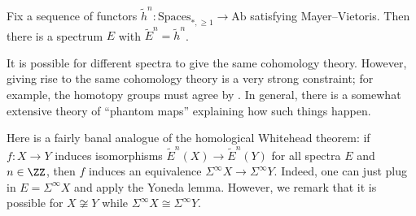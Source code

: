\documentclass[../notes.tex]{subfiles}
\begin{document}
\begin{theorem}
	Fix a sequence of functors $\widetilde h^n\colon\mathrm{Spaces}_{*,\ge1}\to\mathrm{Ab}$ satisfying Mayer--Vietoris. Then there is a spectrum $E$ with $\widetilde E^n=\widetilde h^n$.
\end{theorem}
\begin{remark}
	It is possible for different spectra to give the same cohomology theory. However, giving rise to the same cohomology theory is a very strong constraint; for example, the homotopy groups must agree by . In general, there is a somewhat extensive theory of ``phantom maps'' explaining how such things happen.
\end{remark}
\begin{remark}
	Here is a fairly banal analogue of the homological Whitehead theorem: if $f\colon X\to Y$ induces isomorphisms $\widetilde E^n(X)\to\widetilde E^n(Y)$ for all spectra $E$ and $n\in\ZZ$, then $f$ induces an equivalence $\Sigma^\infty X\to\Sigma^\infty Y$. Indeed, one can just plug in $E=\Sigma^\infty X$ and apply the Yoneda lemma. However, we remark that it is possible for $X\not\cong Y$ while $\Sigma^\infty X\cong\Sigma^\infty Y$.
\end{remark}
\end{document}
